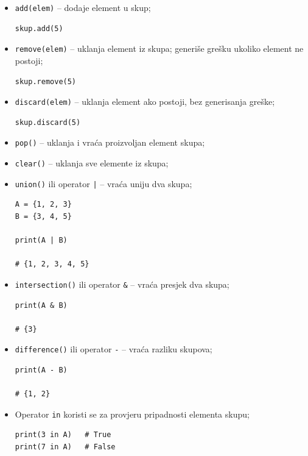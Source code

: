 \begin{itemize}
	
	\item \texttt{add(elem)} -- dodaje element u skup;
	
	\begin{verbatim}
skup.add(5)
\end{verbatim}
	
	\item \texttt{remove(elem)} -- uklanja element iz skupa; generiše grešku ukoliko element ne postoji;
	
	\begin{verbatim}
skup.remove(5)
\end{verbatim}
	
	\item \texttt{discard(elem)} -- uklanja element ako postoji, bez generisanja greške;
	
	\begin{verbatim}
skup.discard(5)
\end{verbatim}
	
	\item \texttt{pop()} -- uklanja i vraća proizvoljan element skupa;
	
	\item \texttt{clear()} -- uklanja sve elemente iz skupa;
	
	\item \texttt{union()} ili operator \texttt{|} -- vraća uniju dva skupa;
	
	\begin{verbatim}
A = {1, 2, 3}
B = {3, 4, 5}

print(A | B)

# {1, 2, 3, 4, 5}
\end{verbatim}
	
	\item \texttt{intersection()} ili operator \texttt{\&} -- vraća presjek dva skupa;
	
	\begin{verbatim}
print(A & B)

# {3}
\end{verbatim}
	
	\item \texttt{difference()} ili operator \texttt{-} -- vraća razliku skupova;
	
	\begin{verbatim}
print(A - B)

# {1, 2}
\end{verbatim}
	
	\item Operator \texttt{in} koristi se za provjeru pripadnosti elementa skupu;
	
	\begin{verbatim}
print(3 in A)   # True
print(7 in A)   # False
\end{verbatim}
	
\end{itemize}

